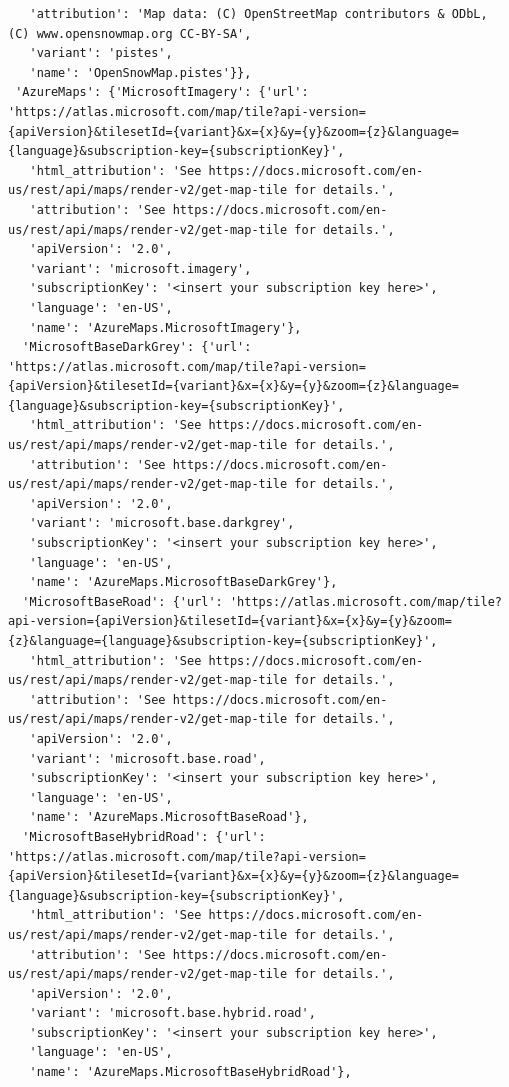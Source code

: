 \documentclass[
  letterpaper,
  DIV=11,
  numbers=noendperiod]{scrreprt}
\begin{document}
\begin{verbatim}
   'attribution': 'Map data: (C) OpenStreetMap contributors & ODbL, (C) www.opensnowmap.org CC-BY-SA',
   'variant': 'pistes',
   'name': 'OpenSnowMap.pistes'}},
 'AzureMaps': {'MicrosoftImagery': {'url': 'https://atlas.microsoft.com/map/tile?api-version={apiVersion}&tilesetId={variant}&x={x}&y={y}&zoom={z}&language={language}&subscription-key={subscriptionKey}',
   'html_attribution': 'See https://docs.microsoft.com/en-us/rest/api/maps/render-v2/get-map-tile for details.',
   'attribution': 'See https://docs.microsoft.com/en-us/rest/api/maps/render-v2/get-map-tile for details.',
   'apiVersion': '2.0',
   'variant': 'microsoft.imagery',
   'subscriptionKey': '<insert your subscription key here>',
   'language': 'en-US',
   'name': 'AzureMaps.MicrosoftImagery'},
  'MicrosoftBaseDarkGrey': {'url': 'https://atlas.microsoft.com/map/tile?api-version={apiVersion}&tilesetId={variant}&x={x}&y={y}&zoom={z}&language={language}&subscription-key={subscriptionKey}',
   'html_attribution': 'See https://docs.microsoft.com/en-us/rest/api/maps/render-v2/get-map-tile for details.',
   'attribution': 'See https://docs.microsoft.com/en-us/rest/api/maps/render-v2/get-map-tile for details.',
   'apiVersion': '2.0',
   'variant': 'microsoft.base.darkgrey',
   'subscriptionKey': '<insert your subscription key here>',
   'language': 'en-US',
   'name': 'AzureMaps.MicrosoftBaseDarkGrey'},
  'MicrosoftBaseRoad': {'url': 'https://atlas.microsoft.com/map/tile?api-version={apiVersion}&tilesetId={variant}&x={x}&y={y}&zoom={z}&language={language}&subscription-key={subscriptionKey}',
   'html_attribution': 'See https://docs.microsoft.com/en-us/rest/api/maps/render-v2/get-map-tile for details.',
   'attribution': 'See https://docs.microsoft.com/en-us/rest/api/maps/render-v2/get-map-tile for details.',
   'apiVersion': '2.0',
   'variant': 'microsoft.base.road',
   'subscriptionKey': '<insert your subscription key here>',
   'language': 'en-US',
   'name': 'AzureMaps.MicrosoftBaseRoad'},
  'MicrosoftBaseHybridRoad': {'url': 'https://atlas.microsoft.com/map/tile?api-version={apiVersion}&tilesetId={variant}&x={x}&y={y}&zoom={z}&language={language}&subscription-key={subscriptionKey}',
   'html_attribution': 'See https://docs.microsoft.com/en-us/rest/api/maps/render-v2/get-map-tile for details.',
   'attribution': 'See https://docs.microsoft.com/en-us/rest/api/maps/render-v2/get-map-tile for details.',
   'apiVersion': '2.0',
   'variant': 'microsoft.base.hybrid.road',
   'subscriptionKey': '<insert your subscription key here>',
   'language': 'en-US',
   'name': 'AzureMaps.MicrosoftBaseHybridRoad'},

\end{verbatim}
\end{document}
